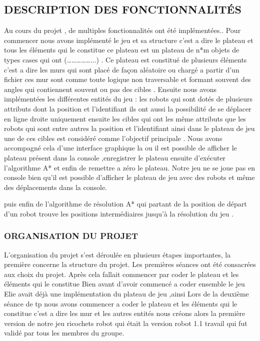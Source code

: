 \documentclass[a4paper]{article} %
\begin{document}
\subsection{DESCRIPTION  DES FONCTIONNALITÉS }
Au cours du projet , de multiples fonctionnalités ont été implémentées..
Pour commencer nous avons implémenté le jeu et sa structure c’est a dire le plateau et tous les éléments qui le constitue ce plateau est un plateau de n*m objets de types cases qui ont (……………...) . Ce plateau est constitué de plusieurs éléments c’est a dire les murs qui sont placé de façon aléatoire ou chargé a partir d’un fichier ces mur sont comme toute logique non traversable et formant souvent des angles qui contiennent souvent ou pas des cibles . Ensuite nous avons implémentées les différentes entités du jeu : les robots qui sont dotés de plusieurs attributs dont la position  et l’identifiant ils ont aussi la possibilité de se déplacer en ligne droite uniquement  ensuite les cibles qui ont les même attributs que les robots qui sont entre autres la position et l’identifiant ainsi dans le plateau de jeu une de ces cibles est considéré comme  l’objectif principale . Nous avons accompagné cela d’une interface graphique la ou il est possible de afficher le plateau présent dans la console ,enregistrer le plateau  ensuite  d’exécuter l’algorithme A* et enfin de remettre a zéro le plateau. 
Notre jeu ne se joue pas en console bien qu’il est possible d’afficher le plateau de jeu avec des robots et même des déplacements dans la console.


puis enfin de l’algorithme de résolution A* qui partant de la position de départ d’un robot trouve les positions intermédiaires jusqu’à la résolution du jeu . 


		\subsubsection{ ORGANISATION DU PROJET 
}
L'organisation du projet s'est déroulée en plusieurs étapes importantes, la première concerne la structure du projet. Les premières séances ont été consacrées aux choix du projet. Après cela fallait commencer par coder le plateau et les éléments qui le constitue 
Bien avant d’avoir commencé a coder ensemble le jeu  Elie avait déjà une implémentation du plateau de jeu ,ainsi Lors de la deuxième séance de tp nous avons commencer a coder le plateau et les éléments qui le constitue c’est a dire les mur et les autres entités nous créons alors la première version de notre  jeu ricochets robot qui était la version robot 1.1 travail qui fut validé par tous les membres du groupe.
\end{document}
